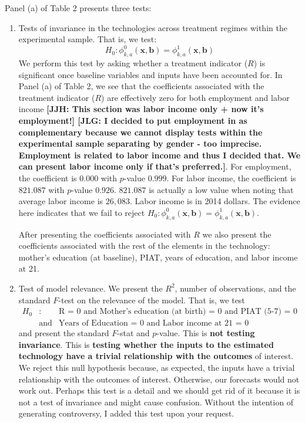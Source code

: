 \noindent Panel (a) of Table 2 presents three tests: 
\begin{enumerate}
\item Tests of invariance in the technologies across treatment regimes within the experimental sample. That is, we test:
	\begin{equation} 
	H_0: \phi_{k,a}^0 \left( \bm{x}, \bm{b} \right) = \phi_{k,a}^1 \left( \bm{x}, \bm{b} \right)  
	\end{equation}
\noindent We perform this test by asking whether a treatment indicator ($R$) is significant once baseline variables and inputs have been accounted for.  In Panel (a) of Table 2, we see that the coefficients associated with the treatment indicator ($R$) are effectively zero for both employment and labor income \textbf{[JJH: This section was labor income only + now it's employment!] [JLG: I decided to put employment in as complementary because we cannot display tests within the experimental sample separating by gender - too imprecise. Employment is related to labor income and thus I decided that. We can present labor income only if that's preferred.]}. For employment, the coefficient is $0.000$ with $p$-value $0.999$. For labor income, the coefficient is $821.087$ with $p$-value $0.926$. $821.087$ is actually a low value when noting that average labor income is $26,083$. Labor income is in 2014 dollars. The evidence here indicates that we fail to reject $H_0: \phi_{k,a}^0 \left( \bm{x}, \bm{b} \right) = \phi_{k,a}^1 \left( \bm{x}, \bm{b} \right)$. 

\noindent After presenting the coefficients associated with $R$ we also present the coefficients associated with the rest of the elements in the technology: mother's education (at baseline), PIAT, years of education, and labor income at 21.\\

\item Test of model relevance. We present the $R^2$, number of observations, and the standard $F$-test on the relevance of the model. That is, we test 
	\begin{eqnarray} 
	H_0&:& \text{R = 0 and Mother's education (at birth) = 0 and PIAT (5-7) = 0} \nonumber \\ 
	      & \text{and} & \text{Years of Education = 0 and Labor income at 21 = 0}
	\end{eqnarray}
\noindent and present the standard $F$-stat and $p$-value. This is \textbf{not testing invariance}. This is \textbf{testing whether the inputs to the estimated technology have a trivial relationship with the outcomes} of interest. We reject this null hypothesis because, as expected, the inputs have a trivial relationship with the outcomes of interest. Otherwise, our forecasts would not work out. Perhaps this test is a detail and we should get rid of it because it is not a test of invariance and might cause confusion. Without the intention of generating controversy, I added this test upon your request.\\


\end{enumerate}
